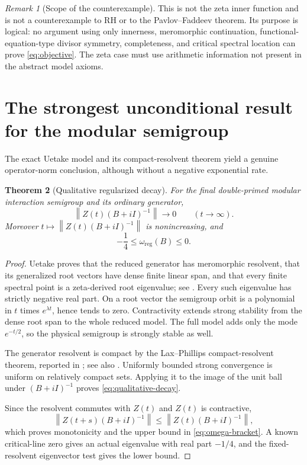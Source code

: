 \documentclass[11pt]{amsart}
\newtheorem{theorem}{Theorem}[section]
\theoremstyle{definition}
\theoremstyle{remark}
\newtheorem{remark}[theorem]{Remark}
\newcommand{\norm}[1]{\left\lVert #1\right\rVert}
\begin{document}
\begin{remark}[Scope of the counterexample]
This is not the zeta inner function and is not a counterexample to RH or to
the Pavlov--Faddeev theorem.  Its purpose is logical: no argument using only
innerness, meromorphic continuation, functional-equation-type divisor
symmetry, completeness, and critical spectral location can prove
\eqref{eq:objective}.  The zeta case must use arithmetic information not
present in the abstract model axioms.
\end{remark}

\section{The strongest unconditional result for the modular semigroup}
\label{sec:qualitative}

The exact Uetake model and its compact-resolvent theorem yield a genuine
operator-norm conclusion, although without a negative exponential rate.

\begin{theorem}[Qualitative regularized decay]
\label{thm:qualitative-decay}
For the final double-primed modular interaction semigroup and its ordinary
generator,
\begin{equation}\label{eq:qualitative-decay}
 \norm{Z(t)(B+iI)^{-1}}\longrightarrow0
 \qquad(t\to\infty).
\end{equation}
Moreover $t\mapsto\norm{Z(t)(B+iI)^{-1}}$ is nonincreasing, and
\begin{equation}\label{eq:omega-bracket}
 -\frac14\leq\omega_{\mathrm{reg}}(B)\leq0.
\end{equation}
\end{theorem}

\begin{proof}
Uetake proves that the reduced generator has meromorphic resolvent, that its
generalized root vectors have dense finite linear span, and that every finite
spectral point is a zeta-derived root eigenvalue; see
\cite[Thms.~4.2 and 4.4]{Uetake2007}.  Every such eigenvalue has strictly
negative real part.  On a root vector the semigroup orbit is a polynomial in
$t$ times $e^{\lambda t}$, hence tends to zero.  Contractivity extends strong
stability from the dense root span to the whole reduced model.  The full
model adds only the mode $e^{-t/2}$, so the physical semigroup is strongly
stable as well.

The generator resolvent is compact by the Lax--Phillips compact-resolvent
theorem, reported in \cite[p.~100]{Uetake2007}; see also
\cite[Thm.~6.17]{LaxPhillips1976}.  Uniformly bounded strong convergence is
uniform on relatively compact sets.  Applying it to the image of the unit
ball under $(B+iI)^{-1}$ proves \eqref{eq:qualitative-decay}.

Since the resolvent commutes with $Z(t)$ and $Z(t)$ is contractive,
\[
 \norm{Z(t+s)(B+iI)^{-1}}
 \leq\norm{Z(t)(B+iI)^{-1}},
\]
which proves monotonicity and the upper bound in
\eqref{eq:omega-bracket}.  A known critical-line zero gives an actual
eigenvalue with real part $-1/4$, and the fixed-resolvent eigenvector test
gives the lower bound.
\end{proof}
\end{document}
